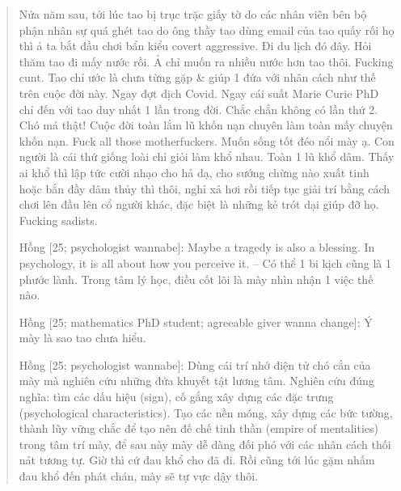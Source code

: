 \documentclass[12pt]{article}
\begin{document}
\begin{quote}
	Nửa năm sau, tới lúc tao bị trục trặc giấy tờ do các nhân viên bên bộ phận nhân sự quá ghét tao do ông thầy tao dùng email của tao quấy rối họ thì ả ta bắt đầu chơi bẩn kiểu covert aggressive. Đi du lịch đó đây. Hỏi thăm tao đi mấy nước rồi. Ả chỉ muốn ra nhiều nước hơn tao thôi. Fucking cunt. Tao chỉ ước là chưa từng gặp \& giúp 1 đứa với nhân cách như thế trên cuộc đời này. Ngay đợt dịch Covid. Ngay cái suất Marie Curie PhD chỉ đến với tao duy nhất 1 lần trong đời. Chắc chắn không có lần thứ 2. Chó má thật! Cuộc đời toàn lắm lũ khốn nạn chuyên làm toàn mấy chuyện khốn nạn. Fuck all those motherfuckers. Muốn sống tốt đéo nổi mày ạ. Con người là cái thứ giống loài chỉ giỏi làm khổ nhau. Toàn 1 lũ khổ dâm. Thấy ai khổ thì lập tức cười nhạo cho hả dạ, cho sướng chừng nào xuất tinh hoặc bắn đầy dâm thủy thì thôi, nghỉ xả hơi rồi tiếp tục giải trí bằng cách chơi lên đầu lên cổ người khác, đặc biệt là những kẻ trót dại giúp đỡ họ. Fucking sadists.
	
	{\sf Hồng [25; psychologist wannabe]}: Maybe a tragedy is also a blessing. In psychology, it is all about how you perceive it. -- Có thể 1 bi kịch cũng là 1 phước lành. Trong tâm lý học, điều cốt lõi là mày nhìn nhận 1 việc thế nào.
	
	{\sf Hồng [25; mathematics PhD student; agreeable giver wanna change]}: Ý mày là sao tao chưa hiểu.
	
	{\sf Hồng [25; psychologist wannabe]}: Dùng cái trí nhớ điện tử chó cắn của mày mà nghiên cứu những đứa khuyết tật lương tâm. Nghiên cứu đúng nghĩa: tìm các dấu hiệu (sign), cố gắng xây dựng các đặc trưng (psychological characteristics). Tạo các nền móng, xây dựng các bức tường, thành lũy vững chắc để tạo nên đế chế tinh thần (empire of mentalities) trong tâm trí mày, để sau này mày dễ dàng đối phó với các nhân cách thối nát tương tự. Giờ thì cứ đau khổ cho đã đi. Rồi cũng tới lúc gặm nhấm đau khổ đến phát chán, mày sẽ tự vực dậy thôi.
\end{quote}
\end{document}
